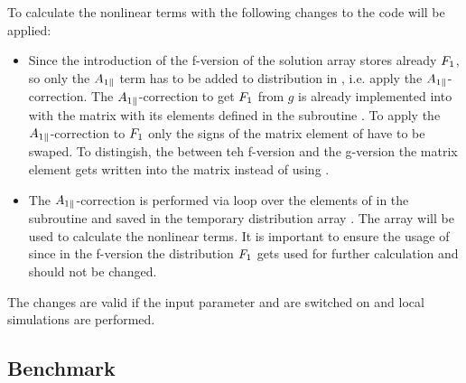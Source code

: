 To calculate the nonlinear terms with {\gkw} the following changes to the code will be applied:
\begin{itemize}
    \item Since the introduction of the f-version of {\gkw} the solution array  stores already $F_1$, so only the $A_{1\parallel}$ term has to be added to distribution in , i.e. apply the $A_{1\parallel}$-correction. The $A_{1\parallel}$-correction to get $F_1$ from $g$ is already implemented into {\gkw} with the matrix  with its elements defined in the subroutine . To apply the $A_{1\parallel}$-correction to $F_1$ only the signs of the matrix element of  have to be swaped. To distingish, the between teh f-version and the g-version the matrix element gets written into the matrix  instead of using .
    \item The $A_{1\parallel}$-correction is performed via loop over the elements of  in the subroutine  and saved in the temporary distribution array . The array  will be used to calculate the nonlinear terms. It is important to ensure the usage of  since in the f-version the distribution $F_1$ gets used for further calculation and should not be changed.
\end{itemize}
The changes are valid if the input parameter  and  are switched on and local simulations are performed.

\subsection{Benchmark}
\label{sub:benchmarkNonlinearFVersion}

